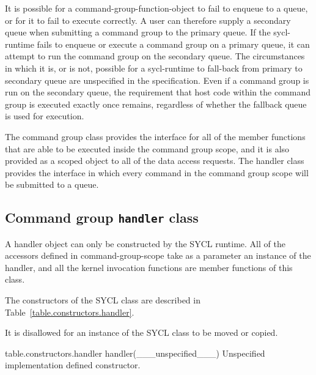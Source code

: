 It is possible for a \gls{command-group-function-object} to fail to enqueue to a queue,
or for it to fail to execute correctly. A user can therefore supply a secondary
queue when submitting a command group to the primary queue. If the \gls{sycl-runtime}
fails to enqueue or execute a command group on a primary queue, it can attempt
to run the command group on the secondary queue. The circumstances in which it
is, or is not, possible for a \gls{sycl-runtime} to fall-back from primary to
secondary queue are unspecified in the specification.  Even if a command group
is run on the secondary queue, the requirement that host code within the command group
is executed exactly once remains, regardless of whether the fallback queue is used for
execution.

The command group  class provides the interface
for all of the member functions that are able to be executed inside the command group
scope, and it is also provided as a scoped object to all of the data access
requests. The \gls{handler} class provides the interface
in which every command in the command group scope will be submitted to a queue.


\subsection{Command group \texttt{handler} class}
\label{sec:handlerClass}

A \gls{handler} object can only be constructed by the SYCL
runtime. All of the accessors defined in \gls{command-group-scope} take as a
parameter an instance of the \gls{handler}, and all the
kernel invocation functions are member functions of this class.

The constructors of the SYCL  class are described in Table~\ref{table.constructors.handler}.

It is disallowed for an instance of the SYCL  class to be moved or copied.


{table.constructors.handler}
  \addRow
    {handler(___unspecified___)}
    {
      Unspecified implementation defined constructor.
    }
\completeTable

